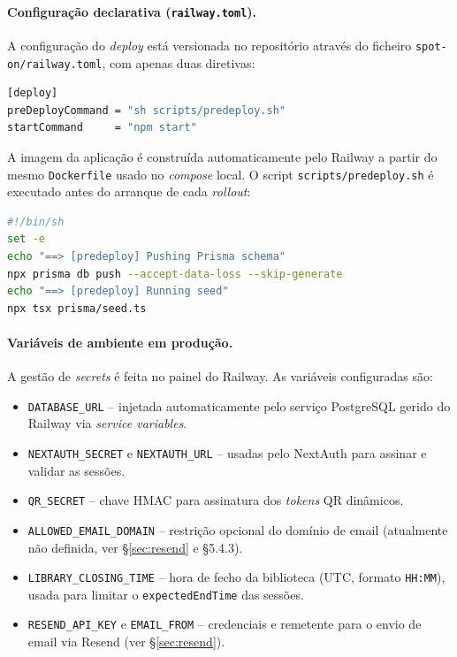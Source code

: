 \documentclass[11pt,a4paper]{article}
\begin{document}
\paragraph{Configuração declarativa (\texttt{railway.toml}).}
A configuração do \emph{deploy} está versionada no repositório através do
ficheiro \texttt{spot-on/railway.toml}, com apenas duas diretivas:

\begin{lstlisting}[language=bash]
[deploy]
preDeployCommand = "sh scripts/predeploy.sh"
startCommand     = "npm start"
\end{lstlisting}

A imagem da aplicação é construída automaticamente pelo Railway a partir do
mesmo \texttt{Dockerfile} usado no \emph{compose} local. O script
\texttt{scripts/predeploy.sh} é executado antes do arranque de cada
\emph{rollout}:

\begin{lstlisting}[language=bash]
#!/bin/sh
set -e
echo "==> [predeploy] Pushing Prisma schema"
npx prisma db push --accept-data-loss --skip-generate
echo "==> [predeploy] Running seed"
npx tsx prisma/seed.ts
\end{lstlisting}

\paragraph{Variáveis de ambiente em produção.}
A gestão de \emph{secrets} é feita no painel do Railway. As variáveis
configuradas são:

\begin{itemize}[leftmargin=*]
    \item \texttt{DATABASE\_URL} -- injetada automaticamente pelo serviço
          PostgreSQL gerido do Railway via \emph{service variables}.
    \item \texttt{NEXTAUTH\_SECRET} e \texttt{NEXTAUTH\_URL} -- usadas pelo
          NextAuth para assinar e validar as sessões.
    \item \texttt{QR\_SECRET} -- chave HMAC para assinatura dos \emph{tokens}
          QR dinâmicos.
    \item \texttt{ALLOWED\_EMAIL\_DOMAIN} -- restrição opcional do domínio de
          email (atualmente não definida, ver \S\ref{sec:resend} e \S5.4.3).
    \item \texttt{LIBRARY\_CLOSING\_TIME} -- hora de fecho da biblioteca
          (UTC, formato \texttt{HH:MM}), usada para limitar o
          \texttt{expectedEndTime} das sessões.
    \item \texttt{RESEND\_API\_KEY} e \texttt{EMAIL\_FROM} -- credenciais e
          remetente para o envio de email via Resend (ver \S\ref{sec:resend}).
\end{itemize}
\end{document}
